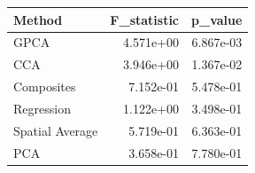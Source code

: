 \begin{tabular}{lrr}
\toprule
Method & F_statistic & p_value \\
\midrule
GPCA & 4.571e+00 & 6.867e-03 \\
CCA & 3.946e+00 & 1.367e-02 \\
Composites & 7.152e-01 & 5.478e-01 \\
Regression & 1.122e+00 & 3.498e-01 \\
Spatial Average & 5.719e-01 & 6.363e-01 \\
PCA & 3.658e-01 & 7.780e-01 \\
\bottomrule
\end{tabular}
